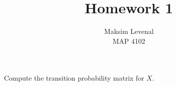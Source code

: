 \documentclass[12pt]{article}
\newenvironment{problem}[2][Problem]{\begin{trivlist}
\item[\hskip \labelsep {\bfseries #1}\hskip \labelsep {\bfseries #2.}]}{\end{trivlist}}
\begin{document}
 
 
\title{Homework 1}%
\author{Maksim Levenal\\ %
MAP 4102} %
 
\maketitle
 
\begin{problem}{1(a)} %
Compute the transition probability matrix for $X$.
\end{problem}
 
\end{document}
